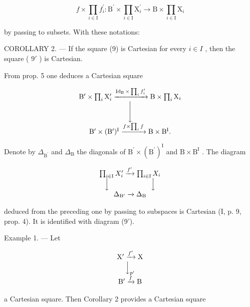\[
f \times \prod_ {i \in \mathrm{I}} f _ {i} ^ {\prime} \colon \mathrm{B} ^ {\prime} \times \prod_ {i \in \mathrm{I}} \mathrm{X} _ {i} ^ {\prime} \to \mathrm{B} \times \prod_ {i \in \mathrm{I}} \mathrm{X} _ {i}
\]

by passing to subsets. With these notations:

COROLLARY 2. --- If the square (9) is Cartesian for every \(i \in I\) , then the square ( \(9'\) ) is Cartesian.

From prop. 5 one deduces a Cartesian square

\[
\begin{array}{c} \mathrm{B} ^ {\prime} \times \prod_ {i} \mathrm{X} _ {i} ^ {\prime} \xrightarrow {\operatorname{Id} _ {\mathrm{B}} \times \prod_ {i} f _ {i} ^ {\prime}} \mathrm{B} \times \prod_ {i} \mathrm{X} _ {i} \\ \Biggl \downarrow \\ \mathrm{B} ^ {\prime} \times (\mathrm{B} ^ {\prime}) ^ {\mathrm{I}} \xrightarrow {f \times \prod_ {i} f} \mathrm{B} \times \mathrm{B} ^ {\mathrm{I}}  . \end{array}
\]

Denote by \(\Delta_{\mathrm{B}^{\prime}}\) and \(\Delta_{\mathrm{B}}\) the diagonals of \(\mathrm{B}^{\prime}\times (\mathrm{B}^{\prime})^{\mathrm{I}}\) and \(\mathrm{B}\times \mathrm{B}^{\mathrm{I}}\) . The diagram

\[
\begin{array}{c} \prod_ {i \in \mathrm{I}} X _ {i} ^ {\prime} \xrightarrow {f ^ {\prime}} \prod_ {i \in \mathrm{I}} X _ {i} \\ \Big \downarrow \qquad \qquad \qquad \Big \downarrow \\ \Delta_ {\mathrm{B} ^ {\prime}} \xrightarrow {} \Delta_ {\mathrm{B}} \end{array}
\]

deduced from the preceding one by passing to subspaces is Cartesian (I, p. 9, prop. 4). It is identified with diagram (9').

Example 1. --- Let

\[
\begin{array}{c} \mathrm {X^ {\prime}} \xrightarrow {f ^ {\prime}} \mathrm{X} \\ \Big \downarrow_ {p ^ {\prime}} \\ \mathrm {B^ {\prime}} \xrightarrow {f} \mathrm{B} \end{array}
\]

a Cartesian square. Then Corollary 2 provides a Cartesian square


